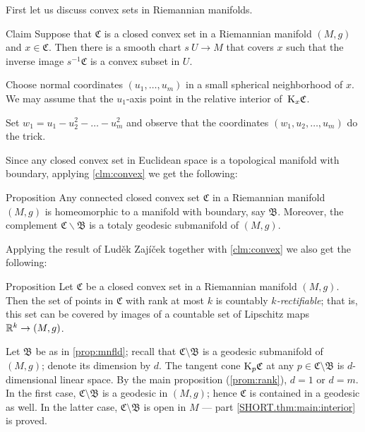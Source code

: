 \documentclass[a4paper,10pt]{article}
\begin{document}
First let us discuss convex sets in Riemannian manifolds.

\begin{thm}{Claim}\label{clm:convex}
Suppose that $\mathfrak{C}$ is a closed convex set in a Riemannian manifold $(M,g)$ and $x\in \mathfrak{C}$.
Then there is a smooth chart $s\:U\to M$ that covers $x$ such that the inverse image $s^{-1}\mathfrak{C}$ is a convex subset in $U$.
\end{thm}

Choose normal coordinates $(u_1,\dots, u_m)$ in a small spherical neighborhood of $x$.
We may assume that the $u_1$-axis point in the relative interior of~$\mathrm{K}_x\mathfrak{C}$.

Set $w_1=u_1-u_2^2-\dots-u_m^2$ and observe that the coordinates
$(w_1,u_2,\dots, u_m)$ do the trick.
\qeds

Since any closed convex set in Euclidean space is a topological manifold with boundary, applying \ref{clm:convex} we get the following:

\begin{thm}{Proposition}\label{prop:mnfld}
Any connected closed convex set $\mathfrak{C}$ in a Riemannian manifold $(M,g)$ is homeomorphic to a manifold with boundary, say $\mathfrak{B}$.
Moreover, the complement $\mathfrak{C}\backslash \mathfrak{B}$ is a totaly geodesic submanifold of $(M,g)$.
\end{thm}

Applying the result of Luděk 
Zajíček \cite{zajicek} 
together with \ref{clm:convex} we also get the following:

\begin{thm}{Proposition}\label{prop:rectifiable}
Let $\mathfrak{C}$ be a closed convex set in a Riemannian manifold $(M,g)$.
Then the set of points in $\mathfrak{C}$ with rank at most $k$ is countably \emph{$k$-rectifiable};
that is, this set can be  covered by images of a countable set of Lipschitz maps $\mathbb{R}^k\to (M,g)$.
\end{thm}

Let $\mathfrak B$ be as in \ref{prop:mnfld}; recall that $\mathfrak C\setminus \mathfrak B$ is a geodesic submanifold of $(M,g)$;
denote its dimension by $d$.
The tangent cone $\mathrm{K}_p \mathfrak C$ at any $p \in \mathfrak C\setminus \mathfrak B$ is $d$-dimensional linear space.
By the main proposition (\ref{prom:rank}), $d=1$ or $d=m$.
In the first case, $\mathfrak C\setminus \mathfrak B$ is a geodesic in $(M,g)$;
hence $\mathfrak C$ is contained in a geodesic as well.
In the latter case, $\mathfrak C\setminus \mathfrak B$ is open in $M$ --- part \ref{SHORT.thm:main:interior} is proved.
\end{document}
